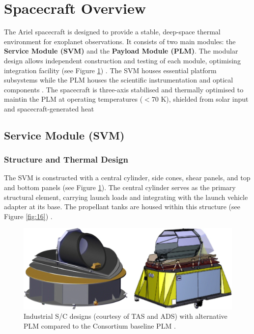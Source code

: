 \documentclass[12pt]{article}
\begin{document}
\newpage

\section{Spacecraft Overview} \label{sec:4}

The Ariel spacecraft is designed to provide a stable, deep-space thermal environment for exoplanet observations. It consists of two main modules: the \textbf{Service Module (SVM)} and the \textbf{Payload Module (PLM)}.
The modular design allows independent construction and testing of each module, optimising integration facility (see Figure \ref{fig:15}) \cite{salvignol2024ariel}.
The SVM houses essential platform subsystems while the PLM houses the scientific instrumentation and optical components \cite{salvignol2024ariel}. The spacecraft is three-axis stabilised and thermally optimised to maintin the PLM at operating temperatures ($<$70 K), shielded from solar
input and spacecraft-generated heat \cite{salvignol2024ariel}

\subsection{Service Module (SVM)} \label{sec:4.1}

\subsubsection{Structure and Thermal Design} \label{sec:4.1.1}

The SVM is constructed with a central cylinder, side cones, shear panels, and top and bottom panels (see Figure \ref{fig:15}). The central cylinder serves as the primary structural element, carrying launch loads and integrating with the launch vehicle adapter at its base. 
The propellant tanks are housed within this structure (see Figure \ref{fig:16}) \cite{morgante2022thermal}.

\begin{figure}[H]
    \centering
    \includegraphics[width=\textwidth]{industrial ariel.png}
    \caption{Industrial S/C designs (courtesy of TAS and ADS) with alternative PLM compared to the Consortium baseline PLM \protect\cite{puig2018phase}.}
    \label{fig:15}
\end{figure}
\end{document}
